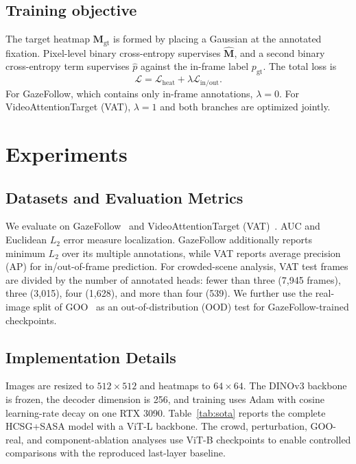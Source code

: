 \documentclass{article}
\begin{document}
\subsection{Training objective}
The target heatmap $\mathbf M_{\mathrm{gt}}$ is formed by placing a Gaussian at the annotated fixation. Pixel-level binary cross-entropy supervises $\hat{\mathbf M}$, and a second binary cross-entropy term supervises $\hat p$ against the in-frame label $p_{\mathrm{gt}}$. The total loss is
\begin{equation}
  \mathcal L=\mathcal L_{\mathrm{heat}}+\lambda\mathcal L_{\mathrm{in/out}}.
  \label{eq:objective}
\end{equation}
For GazeFollow, which contains only in-frame annotations, $\lambda=0$. For VideoAttentionTarget (VAT), $\lambda=1$ and both branches are optimized jointly.

\section{Experiments}
\label{sec:experiments}

\subsection{Datasets and Evaluation Metrics}
We evaluate on GazeFollow~\cite{recasens2015they} and VideoAttentionTarget (VAT)~\cite{chong2020detecting}. AUC and Euclidean $L_2$ error measure localization. GazeFollow additionally reports minimum $L_2$ over its multiple annotations, while VAT reports average precision (AP) for in/out-of-frame prediction. For crowded-scene analysis, VAT test frames are divided by the number of annotated heads: fewer than three (7,945 frames), three (3,015), four (1,628), and more than four (539). We further use the real-image split of GOO~\cite{wang2022gatector} as an out-of-distribution (OOD) test for GazeFollow-trained checkpoints.

\subsection{Implementation Details}
Images are resized to $512\times512$ and heatmaps to $64\times64$. The DINOv3 backbone is frozen, the decoder dimension is 256, and training uses Adam with cosine learning-rate decay on one RTX 3090. Table~\ref{tab:sota} reports the complete HCSG+SASA model with a ViT-L backbone. The crowd, perturbation, GOO-real, and component-ablation analyses use ViT-B checkpoints to enable controlled comparisons with the reproduced last-layer baseline.
\end{document}
